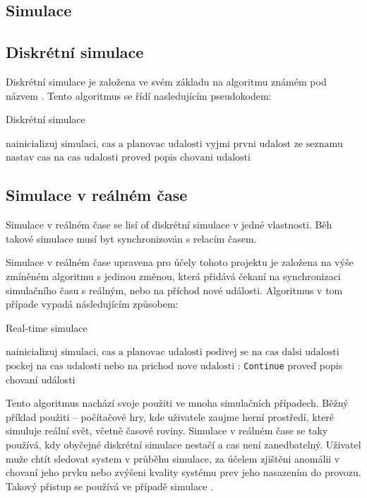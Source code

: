 \subsection{Simulace}
\subsection{Diskrétní simulace}
Diskrétní simulace je založena ve svém základu na algoritmu známém pod názvem . Tento algoritmus se řídí nasledujícím pseudokodem:
\begin{algorithm}
  \caption{Diskrétní simulace}\label{euclid}
  \begin{algorithmic}[1]
  \State $\text{nainicializuj simulaci, cas a planovac udalosti}$
  \State $\text{vyjmi prvni udalost ze seznamu}$
    \Return
  \EndIf
  \State $\text{nastav cas na cas udalosti}$
  \State $\text{proved popis chovani udalosti}$
  \EndWhile
  \end{algorithmic}
  \end{algorithm}
\subsection{Simulace v reálném čase}
Simulace v reálném čase se lisí of diskrétní simulace v jedné vlastnosti. Běh takové simulace musí byt synchronizován s relacím časem. 

Simulace v reálném čase upravena pro účely tohoto projektu je založena na výše zmíněném algoritmu  s jedinou změnou, která přidává čekaní na synchronizaci simulačního času s reálným, nebo na příchod nové události. Algoritmus v tom případe vypadá následujícím způsobem:

\begin{algorithm}
\caption{Real-time simulace}\label{euclid}
\begin{algorithmic}[1]
\State $\text{nainicializuj simulaci, cas a planovac udalosti}$
\State $\text{podivej se na cas dalsi udalosti}$
\Return
\EndIf
\State $\text{pockej na cas udalosti nebo na prichod nove udalosti}$
:
    \State \texttt{Continue}
\EndIf
\State proveď popis chovaní události
\EndWhile
\end{algorithmic}
\end{algorithm}

Tento algoritmus nachází svoje použiti ve mnoha simulačních případech. Běžný příklad použiti -- počítačové hry, kde uživatele zaujme herní prostředí, které simuluje reální svět, včetně časové roviny. Simulace v reálném čase se taky používá, kdy obyčejné diskrétní simulace nestačí a cas není zanedbatelný. Uživatel muže chtít sledovat system v průběhu simulace, za účelem zjištěni anomálii v chovaní jeho prvku nebo zvýšeni kvality systému prev jeho nasazením do provozu. Takový přistup se používá ve případě simulace \hyperref[subsec:hwil]{}.

